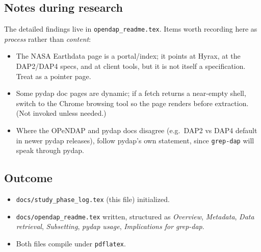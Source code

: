 \documentclass[11pt]{article}
\begin{document}
\subsection*{Notes during research}

The detailed findings live in \texttt{opendap\_readme.tex}.  Items
worth recording here as \emph{process} rather than \emph{content}:

\begin{itemize}
  \item The NASA Earthdata page is a portal/index; it points at
    Hyrax, at the DAP2/DAP4 specs, and at client tools, but it is
    not itself a specification. Treat as a pointer page.
  \item Some pydap doc pages are dynamic; if a fetch returns
    a near-empty shell, switch to the Chrome browsing tool so the
    page renders before extraction. (Not invoked unless needed.)
  \item Where the OPeNDAP and pydap docs disagree (e.g.\ DAP2 vs
    DAP4 default in newer pydap releases), follow pydap's own
    statement, since \texttt{grep-dap} will speak through pydap.
\end{itemize}

\subsection*{Outcome}

\begin{itemize}
  \item \texttt{docs/study\_phase\_log.tex} (this file) initialized.
  \item \texttt{docs/opendap\_readme.tex} written, structured as
    \emph{Overview}, \emph{Metadata}, \emph{Data retrieval},
    \emph{Subsetting}, \emph{pydap usage}, \emph{Implications for
    grep-dap}.
  \item Both files compile under \texttt{pdflatex}.
\end{itemize}
\end{document}
